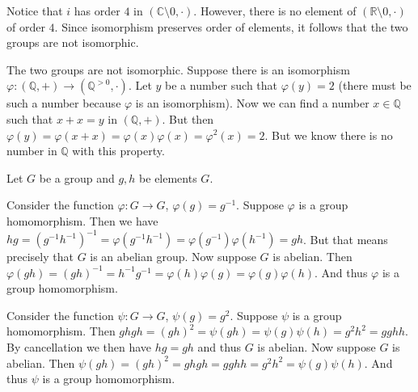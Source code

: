 \begin{problem}
\end{problem}

\begin{solution}
	Notice that $i$ has order $4$ in $(\mathbb{C} \setminus 0, \cdot)$. However, there is no element of $(\mathbb{R} \setminus 0, \cdot)$ of order $4$. Since isomorphism preserves order of elements, it follows that the two groups are not isomorphic.
\end{solution}

\begin{problem}
\end{problem}

\begin{solution}
	The two groups are not isomorphic. Suppose there is an isomorphism $\varphi: (\mathbb{Q}, +) \to (\mathbb{Q}^{>0}, \cdot)$. Let $y$ be a number such that $\varphi(y) = 2$ (there must be such a number because $\varphi$ is an isomorphism). Now we can find a number $x \in \mathbb{Q}$ such that $x + x = y$ in $(\mathbb{Q}, +)$. But then $\varphi(y) = \varphi(x + x) = \varphi(x) \varphi(x) = \varphi^2(x) = 2$. But we know there is no number in $\mathbb{Q}$ with this property.
\end{solution}

\begin{problem}
\end{problem}

\begin{solution}
	Let $G$ be a group and $g, h$ be elements $G$. 
	
	Consider the function $\varphi: G \to G$, $\varphi(g) = g^{-1}$. Suppose $\varphi$ is a group homomorphism. Then we have $hg = (g^{-1} h^{-1})^{-1} = \varphi(g^{-1} h^{-1}) = \varphi(g^{-1})\varphi(h^{-1}) = gh$. But that means precisely that $G$ is an abelian group. Now suppose $G$ is abelian. Then $\varphi(gh) = (gh)^{-1} = h^{-1} g^{-1} = \varphi(h) \varphi(g) = \varphi(g) \varphi(h)$. And thus $\varphi$ is a group homomorphism.
	
	Consider the function $\psi: G \to G$, $\psi(g) = g^2$. Suppose $\psi$ is a group homomorphism. Then $ghgh = (gh)^2 = \psi(gh) = \psi(g) \psi(h) = g^2 h^2 = gghh$. By cancellation we then have $hg = gh$ and thus $G$ is abelian. Now suppose $G$ is abelian. Then $\psi(gh) = (gh)^2 = ghgh = gghh = g^2 h^2 = \psi(g) \psi(h)$. And thus $\psi$ is a group homomorphism.
\end{solution}

